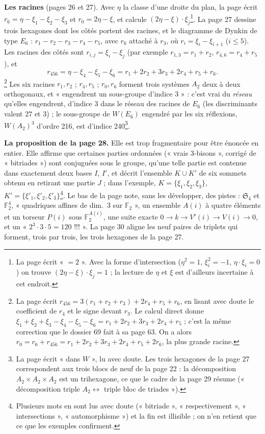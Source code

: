 \documentclass[11pt,a4paper]{article}
\begin{document}
\textbf{Les racines} (pages 26 et 27). Avec $\eta$ la classe d'une droite du
plan, la page écrit $r_6 = \eta - \xi_1 - \xi_2 - \xi_3$ et $r_0 = 2\eta -
\xi$, et calcule $(2\eta - \xi) \cdot \xi_j$\footnote{La page écrit « $= 2$ ».
Avec la forme d'intersection ($\eta^2 = 1$, $\xi_i^2 = -1$, $\eta \cdot \xi_i =
0$) on trouve $(2\eta - \xi) \cdot \xi_j = 1$ ; la lecture de $\eta$ et $\xi$
est d'ailleurs incertaine à cet endroit.}. La page 27 dessine trois hexagones
dont les côtés portent des racines, et le diagramme de Dynkin de type $E_6$ :
$r_1 - r_2 - r_3 - r_4 - r_5$, avec $r_6$ attaché à $r_3$, où $r_i = \xi_i -
\xi_{i+1}$ ($i \leq 5$). Les racines des côtés sont $r_{i,j} = \xi_i - \xi_j$
(par exemple $r_{1,3} = r_1 + r_2$, $r_{4,6} = r_4 + r_5$), et
\[
r_{456} = \eta - \xi_4 - \xi_5 - \xi_6 = r_1 + 2r_2 + 3r_3 + 2r_4 + r_5 +
r_6 .
\]\footnote{La page écrit $r_{456} = 3(r_1 + r_2 + r_3) + 2r_4 + r_5 + r_6$, en
lisant avec doute le coefficient de $r_4$ et le signe devant $r_3$. Le calcul
direct donne $\xi_1 + \xi_2 + \xi_3 - \xi_4 - \xi_5 - \xi_6 = r_1 + 2r_2 + 3r_3
+ 2r_4 + r_5$ ; c'est la même correction que le dossier 69 fait à sa page 63.
On a alors $r_0 = r_6 + r_{456} = r_1 + 2r_2 + 3r_3 + 2r_4 + r_5 + 2r_6$, la
plus grande racine.}
Les six racines $r_1, r_2$ ; $r_4, r_5$ ; $r_0, r_6$ forment trois systèmes
$A_2$ deux à deux orthogonaux, et « engendrent un sous-groupe d'indice 3 » :
c'est vrai du \emph{réseau} qu'elles engendrent, d'indice 3 dans le réseau des
racines de $E_6$ (les discriminants valent $27$ et $3$) ; le sous-groupe de
$W(E_6)$ engendré par les six réflexions, $W(A_2)^3$ d'ordre 216, est
d'indice 240\footnote{La page écrit « dans $W$ », lu avec doute. Les trois
hexagones de la page 27 correspondent aux trois blocs de neuf de la page 22 :
la décomposition $A_2 \times A_2 \times A_2$ est un trihexagone, ce que le cadre
de la page 29 résume (« décomposition triple $A_2 \leftrightarrow$ triple bloc
de triades »).}.

\textbf{La proposition de la page 28.} Elle est trop fragmentaire pour être
énoncée en entier. Elle affirme que certaines parties ordonnées (« vrais
3-bisons », corrigé de « bitriades ») sont conjuguées sous le groupe, qu'une
telle partie est contenue dans exactement deux bases $I$, $I'$, et décrit
l'ensemble $K \cup K'$ de six sommets obtenu en retirant une partie $J$ ; dans
l'exemple, $K = \lbrace \xi_1, \xi_2, \xi_3\rbrace$, $K' = \lbrace \xi'_1,
\xi'_2, \xi'_3\rbrace$\footnote{Plusieurs mots en sont lus avec doute
(« bitriade », « respectivement », « intersections », « automorphisme ») et la
fin est illisible ; on n'en retient que ce que les exemples confirment.}. Le
bas de la page note, sans les développer, des pistes : $\mathfrak{S}_4$ et
$\mathbb{F}_2^4$, « quadriques affines de dim.~3 sur $\mathbb{F}_2$ », un
ensemble $A(i)$ à quatre éléments et un torseur $P(i)$ sous
$\mathbb{F}_2^{A(i)}$, une suite exacte $0 \to k \to V'(i) \to V(i) \to 0$, et
un « $2^3 \cdot 3 \cdot 5 = 120$ !!! ». La page 30 aligne les neuf paires de
triplets qui forment, trois par trois, les trois hexagones de la page 27.
\end{document}
